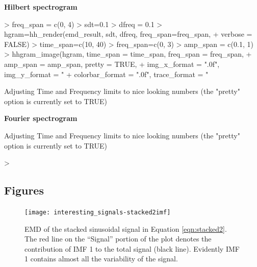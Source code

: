\documentclass[12pt]{article}
\begin{document}
\textbf{Hilbert spectrogram}
\begin{Schunk}
\begin{Sinput}
> freq_span = c(0, 4)
> sdt=0.1
> dfreq = 0.1
> hgram=hh_render(emd_result, sdt, dfreq, freq_span=freq_span, 
+    verbose = FALSE)
> time_span=c(10, 40)
> freq_span=c(0, 3)
> amp_span = c(0.1, 1)
> hhgram_image(hgram, time_span = time_span, freq_span = freq_span,
+     amp_span = amp_span, pretty = TRUE,
+     img_x_format = ".0f", img_y_format = "%
+     colorbar_format = ".0f", trace_format = "%
\end{Sinput}
\begin{Soutput}
Adjusting Time and Frequency limits to nice looking numbers (the "pretty" option is currently set to TRUE)
\end{Soutput}
\end{Schunk}

\textbf{Fourier spectrogram}
\begin{Schunk}
\begin{Soutput}
Adjusting Time and Frequency limits to nice looking numbers (the "pretty" option is currently set to TRUE)
\end{Soutput}
\begin{Sinput}
> 
\end{Sinput}
\end{Schunk}

\subsection{Figures}

\FloatBarrier

\begin{figure}[ht]
\begin{center}
\texttt{[image: interesting\_signals-stacked2imf]}
\end{center}
\caption{EMD of the stacked sinusoidal signal in Equation \ref{eqn:stacked2}.
The red line on the ``Signal'' portion of the plot denotes the contribution of IMF 1 to the total signal (black line).
Evidently IMF 1 contains almost all the variability of the signal.}
\label{fig:stacked2imf}
\end{figure}
\end{document}
